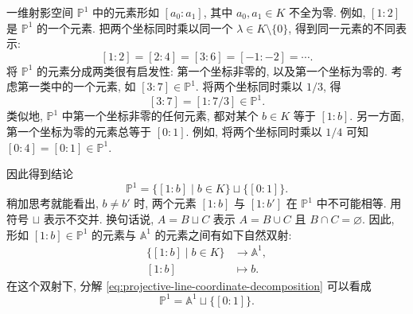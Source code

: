 \begin{Example}{一维射影空间}\leavevmode\label{ex:one-dimensional-projective-space}
$\mathbb{P}^{1}$ 中的元素形如 $[a_{0}:a_{1}]$, 其中 $a_{0},a_{1}\in K$ 不全为零. 例如, $[1:2]$ 是 $\mathbb{P}^{1}$ 的一个元素. 把两个坐标同时乘以同一个 $\lambda\in K\setminus\{0\}$, 得到同一元素的不同表示:
\[
  [1:2]=[2:4]=[3:6]=[-1:-2]=\cdots.
\]
将 $\mathbb{P}^{1}$ 的元素分成两类很有启发性: 第一个坐标非零的, 以及第一个坐标为零的. 考虑第一类中的一个元素, 如 $[3:7]\in\mathbb{P}^{1}$. 将两个坐标同时乘以 $1/3$, 得
\[
  [3:7]=[1:7/3]\in\mathbb{P}^{1}.
\]
类似地, $\mathbb{P}^{1}$ 中第一个坐标非零的任何元素, 都对某个 $b\in K$ 等于 $[1:b]$. 另一方面, 第一个坐标为零的元素总等于 $[0:1]$. 例如, 将两个坐标同时乘以 $1/4$ 可知 $[0:4]=[0:1]\in\mathbb{P}^{1}$.

因此得到结论
\begin{equation}\label{eq:projective-line-coordinate-decomposition}
  \mathbb{P}^{1}=\{[1:b]\mid b\in K\}\sqcup\{[0:1]\}.
\end{equation}
\BookPairedNote
  {稍加思考就能看出, $b\neq b'$ 时, 两个元素 $[1:b]$ 与 $[1:b']$ 在 $\mathbb{P}^{1}$ 中不可能相等.}
  {用符号 $\sqcup$ 表示不交并. 换句话说, $A=B\sqcup C$ 表示 $A=B\cup C$ 且 $B\cap C=\varnothing$.}
因此, 形如 $[1:b]\in\mathbb{P}^{1}$ 的元素与 $\mathbb{A}^{1}$ 的元素之间有如下自然双射:
\[
  \begin{aligned}
    \{[1:b]\mid b\in K\}&\to\mathbb{A}^{1},\\
    [1:b]&\mapsto b.
  \end{aligned}
\]
在这个双射下, 分解 \eqref{eq:projective-line-coordinate-decomposition} 可以看成
\begin{equation}\label{eq:projective-line-affine-plus-one-point}
  \mathbb{P}^{1}=\mathbb{A}^{1}\sqcup\{[0:1]\}.
\end{equation}
\end{Example}

